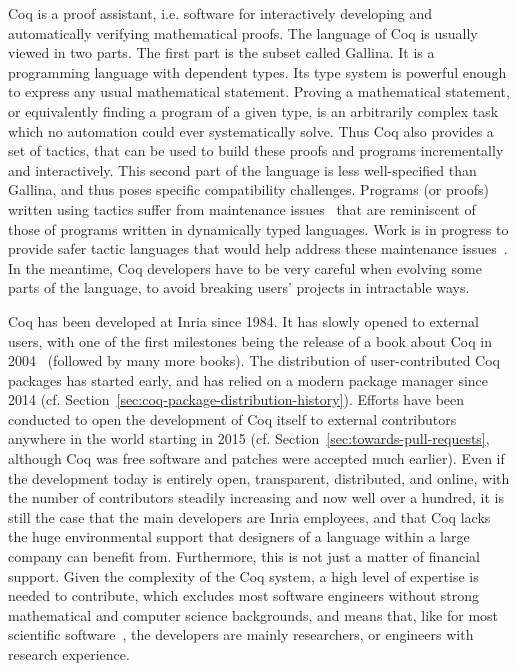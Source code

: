 Coq is a proof assistant, i.e. software for interactively developing and automatically verifying mathematical proofs.
The language of Coq is usually viewed in two parts.
The first part is the subset called Gallina.
It is a programming language with dependent types.
Its type system is powerful enough to express any usual mathematical statement.
Proving a mathematical statement, or equivalently finding a program of a given type, is an arbitrarily complex task which no automation could ever systematically solve.
Thus Coq also provides a set of tactics, that can be used to build these proofs and programs incrementally and interactively.
This second part of the language is less well-specified than Gallina, and thus poses specific compatibility challenges.
Programs (or proofs) written using tactics suffer from maintenance issues~\cite[Section~7.2]{ringer2019qed} that are reminiscent of those of programs written in dynamically typed languages.
Work is in progress to provide safer tactic languages that would help address these maintenance issues~\cite{kaiser2018mtac2}.
In the meantime, Coq developers have to be very careful when evolving some parts of the language, to avoid breaking users' projects in intractable ways.

Coq has been developed at Inria since 1984.
It has slowly opened to external users, with one of the first milestones being the release of a book about Coq in 2004~\cite{bertot2004interactive} (followed by many more books).
The distribution of user-contributed Coq packages has started early, and has relied on a modern package manager since 2014 (cf. Section~\ref{sec:coq-package-distribution-history}).
Efforts have been conducted to open the development of Coq itself to external contributors anywhere in the world starting in 2015 (cf. Section~\ref{sec:towards-pull-requests}, although Coq was free software and patches were accepted much earlier).
Even if the development today is entirely open, transparent, distributed, and online, with the number of contributors steadily increasing and now well over a hundred, it is still the case that the main developers are Inria employees, and that Coq lacks the huge environmental support that designers of a language within a large company can benefit from.
Furthermore, this is not just a matter of financial support.
Given the complexity of the Coq system, a high level of expertise is needed to contribute, which excludes most software engineers without strong mathematical and computer science backgrounds, and means that, like for most scientific software~\cite{segal2008scientific}, the developers are mainly researchers, or engineers with research experience.

